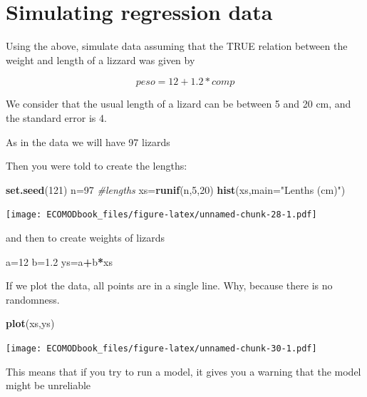 \documentclass[
]{book}
\newenvironment{Shaded}{\begin{snugshade}}{\end{snugshade}}
\newcommand{\CommentTok}[1]{\textcolor[rgb]{0.56,0.35,0.01}{\textit{#1}}}
\newcommand{\DataTypeTok}[1]{\textcolor[rgb]{0.13,0.29,0.53}{#1}}
\newcommand{\DecValTok}[1]{\textcolor[rgb]{0.00,0.00,0.81}{#1}}
\newcommand{\FloatTok}[1]{\textcolor[rgb]{0.00,0.00,0.81}{#1}}
\newcommand{\KeywordTok}[1]{\textcolor[rgb]{0.13,0.29,0.53}{\textbf{#1}}}
\newcommand{\NormalTok}[1]{#1}
\newcommand{\OperatorTok}[1]{\textcolor[rgb]{0.81,0.36,0.00}{\textbf{#1}}}
\newcommand{\StringTok}[1]{\textcolor[rgb]{0.31,0.60,0.02}{#1}}
\begin{document}
\hypertarget{simulating-regression-data}{%
\section{Simulating regression data}\label{simulating-regression-data}}

Using the above, simulate data assuming that the TRUE relation between the weight and length of a lizzard was given by

\[ peso = 12 + 1.2 * comp \]

We consider that the usual length of a lizard can be between 5 and 20 cm, and the standard error is 4.

As in the data we will have 97 lizards

Then you were told to create the lengths:

\begin{Shaded}
\begin{Highlighting}[]
\KeywordTok{set.seed}\NormalTok{(}\DecValTok{121}\NormalTok{)}
\NormalTok{n=}\DecValTok{97}
\CommentTok{#lengths}
\NormalTok{xs=}\KeywordTok{runif}\NormalTok{(n,}\DecValTok{5}\NormalTok{,}\DecValTok{20}\NormalTok{)}
\KeywordTok{hist}\NormalTok{(xs,}\DataTypeTok{main=}\StringTok{"Lenths (cm)"}\NormalTok{)}
\end{Highlighting}
\end{Shaded}

\texttt{[image: ECOMODbook\_files/figure-latex/unnamed-chunk-28-1.pdf]}

and then to create weights of lizards

\begin{Shaded}
\begin{Highlighting}[]
\NormalTok{a=}\DecValTok{12}
\NormalTok{b=}\FloatTok{1.2}
\NormalTok{ys=a}\OperatorTok{+}\NormalTok{b}\OperatorTok{*}\NormalTok{xs}
\end{Highlighting}
\end{Shaded}

If we plot the data, all points are in a single line. Why, because there is no randomness.

\begin{Shaded}
\begin{Highlighting}[]
\KeywordTok{plot}\NormalTok{(xs,ys)}
\end{Highlighting}
\end{Shaded}

\texttt{[image: ECOMODbook\_files/figure-latex/unnamed-chunk-30-1.pdf]}

This means that if you try to run a model, it gives you a warning that the model might be unreliable
\end{document}
